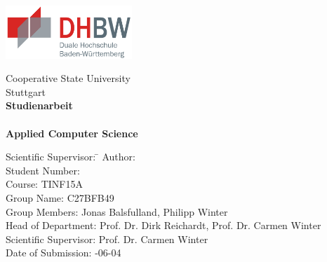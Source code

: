 \begin{titlepage}
\begin{minipage}{\textwidth}
		\vspace{-2cm}
		\noindent  \hfill   \includegraphics[height=2cm, keepaspectratio]{img/dhbw_logo.png}
		\vspace{1cm}
\end{minipage}
\vspace{1em}
\sffamily
\begin{center}
	\textsf{\large{}Cooperative State University\\[1.5mm] Stuttgart}\\[2em] \vspace{1cm}
	\textsf{\textbf{\Large{}Studienarbeit}}\\[3mm] \vspace{1cm}
	\textsf{\textbf{\dertitel}} \\[1.5cm]	\vspace{1cm}
	\textsf{\textbf{\Large{}Applied Computer Science}\\[3mm]}

	\vspace{2cm}
\vfill

\begin{minipage}{\textwidth}

\begin{tabbing}
	Scientific Supervisor: \hspace{0.85cm}\=\kill
	Author: \> \derautor \\[1.5mm]
	Student Number: \\[1.5mm]
	Course: \> TINF15A\\[1.5mm]
	Group Name: \> C27BFB49\\[1.5mm]
	Group Members: \> Jonas Balsfulland, Philipp Winter\\[1.5mm]
	Head of Department: \> Prof. Dr. Dirk Reichardt, Prof. Dr. Carmen Winter\\[1.5mm]
	Scientific Supervisor: \> Prof. Dr. Carmen Winter \\[1.5mm]
	Date of Submission: -06-04\\
\end{tabbing}
\end{minipage}

\end{center}

\end{titlepage}
